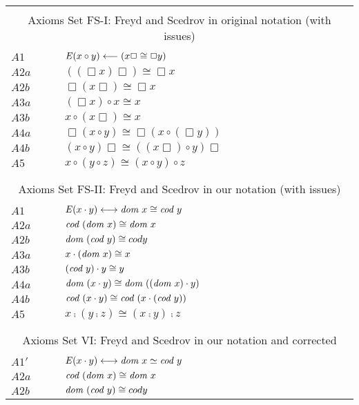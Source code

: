 \begin{table} \centering \normalsize
\begin{tabular}{ll}
\hline
\\
\multicolumn{2}{c}{Axioms Set FS-I:  Freyd and Scedrov in original notation (with issues)} \\
\\
  $A1$ &  $\mathit{E}(x \circ y) \longleftarrow (x\Box \cong \Box y)$ \\ 
  $A2a$ & $((\Box x)\Box) \cong \Box x$ \\ 
  $A2b$ & $\Box (x\Box) \cong \Box x$ \\ 
  $A3a$ & $(\Box x) \circ x \cong x$ \\ 
  $A3b$ & $x \circ (x\Box) \cong x$ \\ 
  $A4a$ & $\Box(x \circ y) \cong \Box(x \circ (\Box y))$ \\ 
  $A4b$ & $(x \circ y)\Box \cong ((x\Box) \circ y)\Box$ \\ 
  $A5$   & $x \circ (y \circ z) \cong  (x \circ y) \circ z$ \\
\\
\hline
\\
\multicolumn{2}{c}{Axioms Set FS-II: Freyd and Scedrov in our notation (with issues)} \\
\\
  $A1$  & $\mathit{E} (x \cdot y) \longleftrightarrow \textit{dom \/} x \cong \textit{cod \/} y$ \\
  $A2a$ & $\textit{cod \/}(\textit{dom \/} x) \cong \textit{dom \/} x$ \\  
  $A2b$ & $\textit{dom \/}(\textit{cod \/} y) \cong cod y$ \\  
  $A3a$  & $x \cdot (\textit{dom \/} x) \cong x$ \\ 
  $A3b$ & $(\textit{cod \/} y) \cdot y \cong y$ \\
  $A4a$ & $\textit{dom \/}(x \cdot y) \cong \textit{dom \/}((\textit{dom \/} x) \cdot y)$ \\ 
  $A4b$ & $\textit{cod \/}(x \cdot y) \cong \textit{cod \/}(x \cdot (\textit{cod \/} y))$ \\ 
  $A5$   & $x \comp (y \comp z) \cong  (x \comp y) \comp z$   \\
\\
\hline
\\
\multicolumn{2}{c}{Axioms Set VI: Freyd and Scedrov in our notation
  and corrected} \\
\\
  $A1'$  & $\mathit{E} (x \cdot y) \longleftrightarrow \textit{dom \/} x \simeq\textit{cod \/} y$ \\
  $A2a$ & $\textit{cod \/}(\textit{dom \/} x) \cong \textit{dom \/} x$ \\  
  $A2b$ & $\textit{dom \/}(\textit{cod \/} y) \cong cod y$ \\  

\end{tabular}
\end{table}
